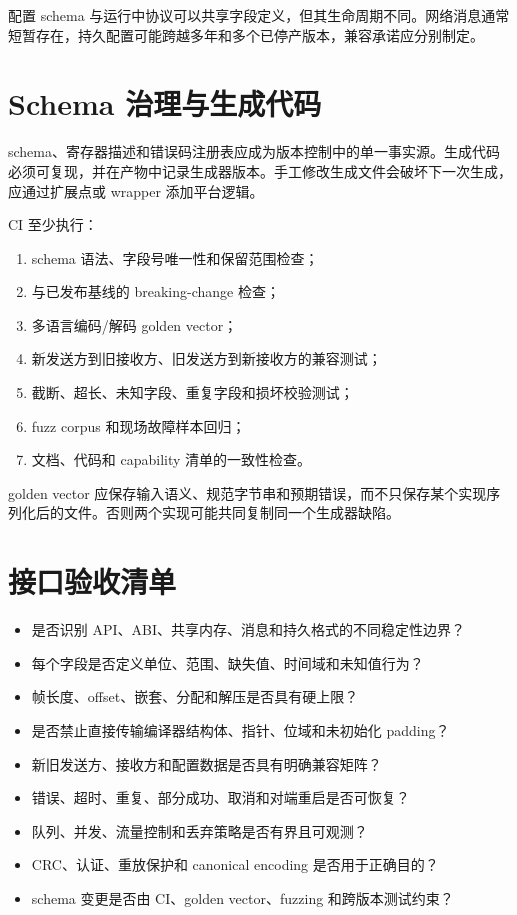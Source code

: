 配置 schema 与运行中协议可以共享字段定义，但其生命周期不同。网络消息通常短暂存在，持久配置可能跨越多年和多个已停产版本，兼容承诺应分别制定。

\section{Schema 治理与生成代码}

schema、寄存器描述和错误码注册表应成为版本控制中的单一事实源。生成代码必须可复现，并在产物中记录生成器版本。手工修改生成文件会破坏下一次生成，应通过扩展点或 wrapper 添加平台逻辑。

CI 至少执行：

\begin{enumerate}
  \item schema 语法、字段号唯一性和保留范围检查；
  \item 与已发布基线的 breaking-change 检查；
  \item 多语言编码/解码 golden vector；
  \item 新发送方到旧接收方、旧发送方到新接收方的兼容测试；
  \item 截断、超长、未知字段、重复字段和损坏校验测试；
  \item fuzz corpus 和现场故障样本回归；
  \item 文档、代码和 capability 清单的一致性检查。
\end{enumerate}

golden vector 应保存输入语义、规范字节串和预期错误，而不只保存某个实现序列化后的文件。否则两个实现可能共同复制同一个生成器缺陷。

\section{接口验收清单}

\begin{itemize}
  \item 是否识别 API、ABI、共享内存、消息和持久格式的不同稳定性边界？
  \item 每个字段是否定义单位、范围、缺失值、时间域和未知值行为？
  \item 帧长度、offset、嵌套、分配和解压是否具有硬上限？
  \item 是否禁止直接传输编译器结构体、指针、位域和未初始化 padding？
  \item 新旧发送方、接收方和配置数据是否具有明确兼容矩阵？
  \item 错误、超时、重复、部分成功、取消和对端重启是否可恢复？
  \item 队列、并发、流量控制和丢弃策略是否有界且可观测？
  \item CRC、认证、重放保护和 canonical encoding 是否用于正确目的？
  \item schema 变更是否由 CI、golden vector、fuzzing 和跨版本测试约束？
\end{itemize}
